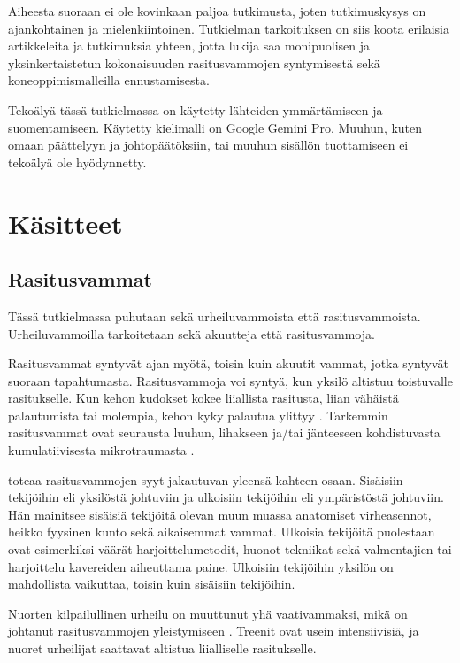 \documentclass[utf8, bachelor]{gradu3}
\begin{document}
Aiheesta suoraan ei ole kovinkaan paljoa tutkimusta, joten tutkimuskysys on ajankohtainen ja mielenkiintoinen. Tutkielman tarkoituksen on siis koota erilaisia artikkeleita ja 
tutkimuksia yhteen, jotta lukija saa monipuolisen ja yksinkertaistetun kokonaisuuden rasitusvammojen syntymisestä sekä koneoppimismalleilla ennustamisesta.

Tekoälyä tässä tutkielmassa on käytetty lähteiden ymmärtämiseen ja suomentamiseen. Käytetty kielimalli on Google Gemini Pro. Muuhun, kuten omaan päättelyyn ja johtopäätöksiin, tai muuhun sisällön 
tuottamiseen ei tekoälyä ole hyödynnetty.

\chapter{Käsitteet}

\section{Rasitusvammat}

Tässä tutkielmassa puhutaan sekä urheiluvammoista että rasitusvammoista. Urheiluvammoilla tarkoitetaan sekä akuutteja että rasitusvammoja.

Rasitusvammat syntyvät ajan myötä, toisin kuin akuutit vammat, jotka syntyvät suoraan tapahtumasta. Rasitusvammoja voi syntyä, kun yksilö altistuu 
toistuvalle rasitukselle. Kun kehon kudokset kokee liiallista rasitusta, liian vähäistä palautumista tai molempia, kehon kyky palautua ylittyy \parencite{johnson_overuse_2008}.
Tarkemmin rasitusvammat ovat seurausta luuhun, lihakseen ja/tai jänteeseen kohdistuvasta kumulatiivisesta 
mikrotraumasta \parencite{brenner_overuse_2024}.

\textcite{johnson_overuse_2008} toteaa rasitusvammojen syyt jakautuvan yleensä kahteen osaan. Sisäisiin tekijöihin eli yksilöstä johtuviin ja ulkoisiin 
tekijöihin eli ympäristöstä johtuviin. Hän mainitsee sisäisiä tekijöitä olevan muun muassa anatomiset virheasennot, heikko fyysinen kunto 
sekä aikaisemmat vammat. Ulkoisia tekijöitä puolestaan ovat esimerkiksi väärät harjoittelumetodit, huonot tekniikat sekä 
valmentajien tai harjoittelu kavereiden aiheuttama paine. Ulkoisiin tekijöihin yksilön on mahdollista vaikuttaa, toisin kuin sisäisiin tekijöihin.

Nuorten kilpailullinen urheilu on muuttunut yhä vaativammaksi, mikä on johtanut rasitusvammojen yleistymiseen \parencite{weerasinghe_computer_2016}. Treenit ovat usein intensiivisiä, 
ja nuoret urheilijat saattavat altistua liialliselle rasitukselle.
\end{document}
